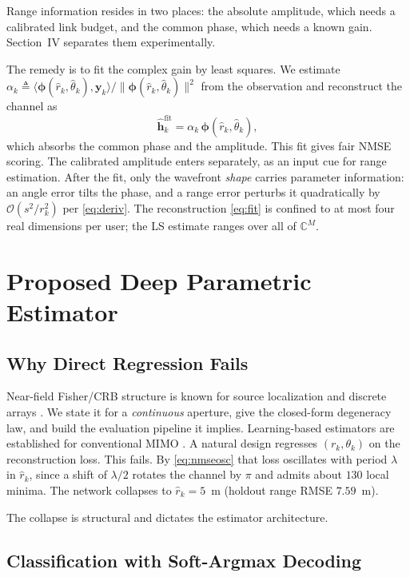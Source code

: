 \documentclass[journal]{IEEEtran}
\begin{document}
Range information resides in two places: the absolute amplitude, which needs a calibrated link budget, and the common phase, which needs a known gain. Section~IV separates them experimentally.

The remedy is to fit the complex gain by least squares. We estimate $\alpha_k \triangleq \langle \bm{\phi}(\hat r_k,\hat\theta_k), \mathbf{y}_k\rangle / \|\bm{\phi}(\hat r_k,\hat\theta_k)\|^{2}$ from the observation and reconstruct the channel as
\begin{equation}
\widehat{\mathbf{h}}_k^{\mathrm{fit}} = \alpha_k \, \bm{\phi}\!\left(\hat r_k, \hat\theta_k\right),
\label{eq:fit}
\end{equation}
which absorbs the common phase and the amplitude. This fit gives fair NMSE scoring. The calibrated amplitude enters separately, as an input cue for range estimation. After the fit, only the wavefront \emph{shape} carries parameter information: an angle error tilts the phase, and a range error perturbs it quadratically by $\mathcal{O}(s^{2}/r_k^{2})$ per \eqref{eq:deriv}. The reconstruction \eqref{eq:fit} is confined to at most four real dimensions per user; the LS estimate ranges over all of $\mathbb{C}^{M}$.
\section{Proposed Deep Parametric Estimator}

\subsection{Why Direct Regression Fails}

Near-field Fisher/CRB structure is known for source localization and discrete arrays \cite{crb,crbnf}. We state it for a \emph{continuous} aperture, give the closed-form degeneracy law, and build the evaluation pipeline it implies. Learning-based estimators are established for conventional MIMO \cite{dlceFound,mdlFound,dlce}. A natural design regresses $(r_k, \theta_k)$ on the reconstruction loss. This fails. By \eqref{eq:nmseosc} that loss oscillates with period $\lambda$ in $\hat r_k$, since a shift of $\lambda/2$ rotates the channel by $\pi$ and admits about $130$ local minima. The network collapses to $\hat r_k = 5$~m (holdout range RMSE $7.59$~m).

The collapse is structural and dictates the estimator architecture.

\subsection{Classification with Soft-Argmax Decoding}
\end{document}
